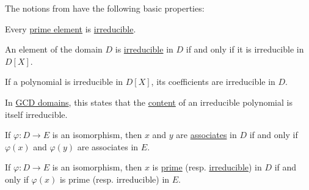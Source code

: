 \begin{proposition}\label{thm:def:domain_divisibility}
  The notions from  have the following basic properties:
  \begin{thmenum}
     Every \hyperref[def:domain_divisibility/prime]{prime element} is \hyperref[def:domain_divisibility/irreducible]{irreducible}.

     An element of the domain \( D \) is \hyperref[def:domain_divisibility/irreducible]{irreducible} in \( D \) if and only if it is irreducible in \( D[X] \).

     If a polynomial is irreducible in \( D[X] \), its coefficients are irreducible in \( D \).

    In \hyperref[def:gcd_domain]{GCD domains}, this states that the \hyperref[def:polynomial_content]{content} of an irreducible polynomial is itself irreducible.

     If \( \varphi: D \to E \) is an isomorphism, then \( x \) and \( y \) are \hyperref[def:domain_divisibility/associates]{associates} in \( D \) if and only if \( \varphi(x) \) and \( \varphi(y) \) are associates in \( E \).

     If \( \varphi: D \to E \) is an isomorphism, then \( x \) is \hyperref[def:domain_divisibility/prime]{prime} (resp. \hyperref[def:domain_divisibility/irreducible]{irreducible}) in \( D \) if and only if \( \varphi(x) \) is prime (resp. irreducible) in \( E \).
  \end{thmenum}
\end{proposition}
